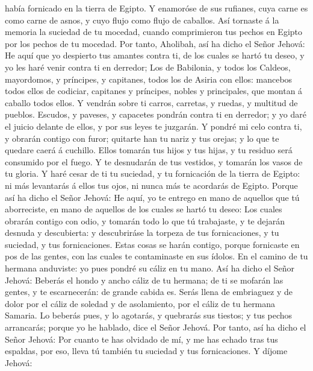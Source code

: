 había fornicado en la tierra de Egipto.  Y enamoróse de sus
rufianes, cuya carne es como carne de asnos, y cuyo flujo como flujo de
caballos.  Así tornaste á la memoria la suciedad de tu
mocedad, cuando comprimieron tus pechos en Egipto por los pechos de tu
mocedad.  Por tanto, Aholibah, así ha dicho el Señor
Jehová: He aquí que yo despierto tus amantes contra ti, de los cuales se
hartó tu deseo, y yo les haré venir contra ti en derredor; 
Los de Babilonia, y todos los Caldeos, mayordomos, y príncipes, y
capitanes, todos los de Asiria con ellos: mancebos todos ellos de
codiciar, capitanes y príncipes, nobles y principales, que montan á
caballo todos ellos.  Y vendrán sobre ti carros, carretas,
y ruedas, y multitud de pueblos. Escudos, y paveses, y capacetes pondrán
contra ti en derredor; y yo daré el juicio delante de ellos, y por sus
leyes te juzgarán.  Y pondré mi celo contra ti, y obrarán
contigo con furor; quitarte han tu nariz y tus orejas; y lo que te
quedare caerá á cuchillo. Ellos tomarán tus hijos y tus hijas, y tu
residuo será consumido por el fuego.  Y te desnudarán de
tus vestidos, y tomarán los vasos de tu gloria.  Y haré
cesar de ti tu suciedad, y tu fornicación de la tierra de Egipto: ni más
levantarás á ellos tus ojos, ni nunca más te acordarás de Egipto.
 Porque así ha dicho el Señor Jehová: He aquí, yo te
entrego en mano de aquellos que tú aborreciste, en mano de aquellos de
los cuales se hartó tu deseo:  Los cuales obrarán contigo
con odio, y tomarán todo lo que tú trabajaste, y te dejarán desnuda y
descubierta: y descubriráse la torpeza de tus fornicaciones, y tu
suciedad, y tus fornicaciones.  Estas cosas se harán
contigo, porque fornicaste en pos de las gentes, con las cuales te
contaminaste en sus ídolos.  En el camino de tu hermana
anduviste: yo pues pondré su cáliz en tu mano.  Así ha
dicho el Señor Jehová: Beberás el hondo y ancho cáliz de tu hermana; de
ti se mofarán las gentes, y te escarnecerán: de grande cabida es.
 Serás llena de embriaguez y de dolor por el cáliz de
soledad y de asolamiento, por el cáliz de tu hermana Samaria.
 Lo beberás pues, y lo agotarás, y quebrarás sus tiestos; y
tus pechos arrancarás; porque yo he hablado, dice el Señor Jehová.
 Por tanto, así ha dicho el Señor Jehová: Por cuanto te has
olvidado de mí, y me has echado tras tus espaldas, por eso, lleva tú
también tu suciedad y tus fornicaciones.  Y díjome Jehová:
